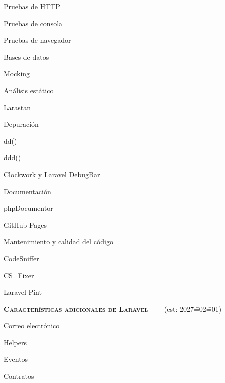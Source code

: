 \begin{longenum}
\begin{longenum}
        \begin{longenum}
            \item Pruebas de HTTP
            \item Pruebas de consola
            \item Pruebas de navegador
            \item Bases de datos
            \item Mocking
        \end{longenum}
        \item Análisis estático
        \begin{longenum}
            \item Larastan
        \end{longenum}
        \item Depuración
        \begin{longenum}
            \item dd()
            \item ddd()
            \item Clockwork y Laravel DebugBar
        \end{longenum}
        \item Documentación
        \begin{longenum}
            \item phpDocumentor
            \item GitHub Pages
        \end{longenum}
        \item Mantenimiento y calidad del código
        \begin{longenum}
            \item CodeSniffer
            \item CS\_Fixer
            \begin{longenum}
                \item Laravel Pint
            \end{longenum}
        \end{longenum}
    \end{longenum}
    \item \textbf{\textsc{Características adicionales de Laravel}} \ \ \ \ (est: 2027\==02\==01)
    \begin{longenum}
        \item Correo electrónico
        \item Helpers
        \item Eventos
        \item Contratos

\end{longenum}
\end{longenum}
